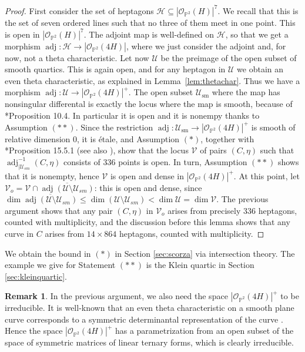 \documentclass[12pt]{article}
\numberwithin{equation}{section}
\theoremstyle{definition}
\newtheorem{remark}[theorem]{Remark}
\begin{document}
\begin{proof}
	First consider the set of heptagons $\mathcal{H}\subseteq |\mathcal{O}_{\mathbb{P}^2}(H)|^7$. We recall that this is the set of seven ordered lines such that no three of them meet in one point. This is open in $|\mathcal{O}_{\mathbb{P}^2}(H)|^7$. The adjoint map is well-defined on $\mathcal{H}$, so that we get a morphism $\operatorname{adj}\colon \mathcal{H} \to |\mathcal{O}_{\mathbb{P}^2}(4H)|$, where we just consider the adjoint and, for now, not a theta characteristic. Let now $\mathcal{U}$ be the preimage of the open subset of smooth quartics. This is again open, and for any heptagon in $\mathcal{U}$ we obtain an even theta characteristic, as explained in Lemma~\ref{lem:thetachar}. Thus we have a morphism $\operatorname{adj}\colon \mathcal{U} \to |\mathcal{O}_{\mathbb{P}^2}(4H)|^+$. The open subset $\mathcal{U}_{\text{sm}}$ where the map has nonsingular differental is exactly the locus where the map is smooth, because of \cite{Hart}*{Proposition 10.4}. In particular it is open and it is nonempy thanks to Assumption $(**)$. Since the restriction $\operatorname{adj}\colon \mathcal{U}_{\text{sm}} \to |\mathcal{O}_{\mathbb{P}^2}(4H)|^+$ is smooth of relative dimension $0$, it is \'etale, and Assumption $(*)$, together with \cite{EGAIV}*{Proposition 15.5.1} (see also \cite{MORomagny}), show that the locus $\mathcal{V}$ of pairs $(C,\eta)$ such that $\operatorname{adj}_{|\mathcal{U}_{sm}}^{-1}(C,\eta)$ consists of $336$ points is open. In turn, Assumption $(**)$ shows that it is nonempty, hence  $\mathcal{V}$ is open and dense in $|\mathcal{O}_{\mathbb{P}^2}(4H)|^+$. At this point, let $\mathcal{V}_o = \mathcal{V}\cap \overline{\operatorname{adj}(\mathcal{U}\setminus \mathcal{U}_{sm})}$: this is open and dense, since $\dim \overline{\operatorname{adj}(\mathcal{U}\setminus \mathcal{U}_{sm})} \leq \dim(\mathcal{U}\setminus \mathcal{U}_{sm}) < \dim \mathcal{U} = \dim \mathcal{V}$. The previous argument shows that any pair $(C,\eta)$ in $\mathcal{V}_o$ arises from precisely $336$ heptagons, counted with multiplicity, and the discussion before this lemma shows that any curve in $C$ arises from $14\times 864$ heptagons, counted with multiplicity. 
\end{proof}

We obtain the bound in $(*)$ in Section \ref{sec:scorza} via intersection theory. The example we give for Statement $(**)$ is the Klein quartic in Section \ref{sec:kleinquartic}.

\begin{remark}\label{rmk:irreducibility}
In the previous argument, we also need the space $|\mathcal{O}_{\mathbb{P}^2}(4H)|^{+}$ to be irreducible. It is well-known that an even theta characteristic on a smooth plane curve corresponds to a symmetric determinantal representation of the curve \cite{BeaDet}. Hence the space $|\mathcal{O}_{\mathbb{P}^2}(4H)|^{+}$ has a parametrization from an open subset of the space of symmetric matrices of linear ternary forms, which is clearly irreducible.
\end{remark} 
\end{document}
